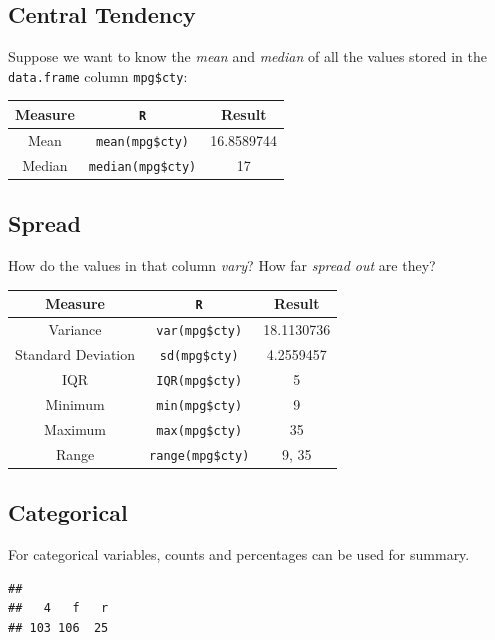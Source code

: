 \documentclass[]{book}
\newenvironment{Shaded}{\begin{snugshade}}{\end{snugshade}}
\newcommand{\KeywordTok}[1]{\textcolor[rgb]{0.13,0.29,0.53}{\textbf{#1}}}
\newcommand{\OperatorTok}[1]{\textcolor[rgb]{0.81,0.36,0.00}{\textbf{#1}}}
\newcommand{\NormalTok}[1]{#1}
\theoremstyle{definition}
\theoremstyle{definition}
\theoremstyle{definition}
\theoremstyle{remark}
\begin{document}
\subsection*{Central Tendency}\label{central-tendency}

Suppose we want to know the \emph{mean} and \emph{median} of all the
values stored in the \texttt{data.frame} column \texttt{mpg\$cty}:

\begin{longtable}[]{@{}ccc@{}}
\toprule
Measure & \texttt{R} & Result\tabularnewline
\midrule
\endhead
Mean & \texttt{mean(mpg\$cty)} & 16.8589744\tabularnewline
Median & \texttt{median(mpg\$cty)} & 17\tabularnewline
\bottomrule
\end{longtable}

\subsection*{Spread}\label{spread}

How do the values in that column \emph{vary}? How far \emph{spread out}
are they?

\begin{longtable}[]{@{}ccc@{}}
\toprule
Measure & \texttt{R} & Result\tabularnewline
\midrule
\endhead
Variance & \texttt{var(mpg\$cty)} & 18.1130736\tabularnewline
Standard Deviation & \texttt{sd(mpg\$cty)} & 4.2559457\tabularnewline
IQR & \texttt{IQR(mpg\$cty)} & 5\tabularnewline
Minimum & \texttt{min(mpg\$cty)} & 9\tabularnewline
Maximum & \texttt{max(mpg\$cty)} & 35\tabularnewline
Range & \texttt{range(mpg\$cty)} & 9, 35\tabularnewline
\bottomrule
\end{longtable}

\subsection*{Categorical}\label{categorical}

For categorical variables, counts and percentages can be used for
summary.

\begin{Shaded}
\end{Shaded}

\begin{verbatim}
## 
##   4   f   r 
## 103 106  25
\end{verbatim}
\end{document}
